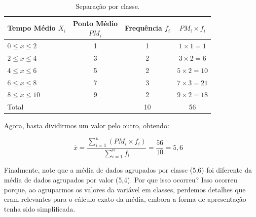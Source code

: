 \begin{table}[H]
    \centering
\begin{tabular}{lccc}
\toprule
\shortstack{Tempo \\Médio \(X_i\)} & \shortstack{Ponto Médio \\\(PM_i\)} &Frequência \(f_i\)    & \(PM_i\times f_i\)\\
\midrule
0\(\leq x \le 2\)    &1  &1 &\(1\times1=1\)\\
2\(\leq x \le 4\)    &3  &2 &\(3\times2=6\)\\
4\(\leq x \le 6\)    &5  &2 &\(5\times2=10\)\\
6\(\leq x \le 8\)    &7  &3 &\(7\times3=21\)\\
8\(\leq x \le 10\)   &9  &2 &\(9\times2=18\)\\
\midrule
Total & & 10 & 56\\
\bottomrule
\end{tabular}
\caption{Separação por classe.}
\end{table}

Agora, basta dividirmos um valor pelo outro, obtendo:

\[
    \bar{x}=\frac{\sum_{i=1}^{n}(PM_i\times f_i)}{\sum_{i=1}^{n}f_i}=\frac{56}{10}=5,6
\]

Finalmente, note que a média de dados agrupados por classe (5,6) foi diferente da média de dados agrupados por valor (5,4). Por que isso ocorreu? Isso ocorreu porque, ao agruparmos os valores da
variável em classes, perdemos detalhes que eram relevantes para o cálculo exato da média, embora a forma de apresentação tenha sido simplificada.